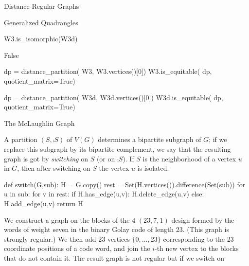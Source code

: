 \begin{chap}{Distance-Regular Graphs}
\begin{sect}{Generalized Quadrangles}
\begin{sagecode}
\begin{sageinput}
W3.is_isomorphic(W3d)
\end{sageinput}
\begin{sageoutput}
False
\end{sageoutput}
\end{sagecode}
%
\begin{sagecode}
\begin{sageinput}
dp = distance_partition( W3, W3.vertices()[0])
W3.is_equitable( dp, quotient_matrix=True) 
\end{sageinput}
\begin{sageoutput}
[ 0 12  0]
[ 1  2  9]
[ 0  4  8]
\end{sageoutput}
\end{sagecode}
%
\begin{sagecode}
\begin{sageinput}
dp = distance_partition( W3d, W3d.vertices()[0])
W3d.is_equitable( dp, quotient_matrix=True) 
\end{sageinput}
\begin{sageoutput}
[ 0 12  0]
[ 1  2  9]
[ 0  4  8]
\end{sageoutput}
\end{sagecode}
%
\end{sect}
%
\begin{sect}{The McLaughlin Graph}
%
\begin{para}
A partition $(S,\comp{S})$ of $V(G)$ determines a bipartite subgraph of $G$;
if we replace this subgraph by its bipartite complement, we say that the
resulting graph is got by \textsl{switching} on $S$ (or on $\comp{S}$).
If $S$ is the neighborhood of a vertex $u$ in $G$, then after switching
on $S$ the vertex $u$ is isolated.
\end{para}
%
\begin{sagecode}
\begin{sageinput}
def switch(G,sub):
    H = G.copy()
    rest = Set(H.vertices()).difference(Set(sub))
    for u in sub:
        for v in rest:
            if H.has_edge(u,v): H.delete_edge(u,v)
            else: H.add_edge(u,v)
    return H   
\end{sageinput}
\end{sagecode}
%
\begin{para}
We construct a graph on the blocks of the $4$-$(23,7,1)$ design
formed by the words of weight seven in the binary Golay code of length 23.
(This graph is strongly regular.)
We then add 23 vertices $\{0,\ldots,23\}$ corresponding to the 23 coordinate 
positions of a code word, and join the $i$-th new vertex to the blocks
that do not contain it. The result graph is not regular but if we switch on

\end{para}
\end{sect}
\end{chap}
